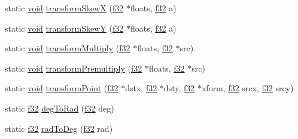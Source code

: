 \begin{DoxyCompactItemize}
\item 
static \mbox{\hyperlink{_thread_8h_af1e856da2e658414cb2456cb6f7ebc66}{void}} \mbox{\hyperlink{classnjli_1_1_world_h_u_d_ab8f44613e057b3fd9cbcdd157e1b5c8b}{transform\+SkewX}} (\mbox{\hyperlink{_util_8h_a5f6906312a689f27d70e9d086649d3fd}{f32}} $\ast$floats, \mbox{\hyperlink{_util_8h_a5f6906312a689f27d70e9d086649d3fd}{f32}} a)
\item 
static \mbox{\hyperlink{_thread_8h_af1e856da2e658414cb2456cb6f7ebc66}{void}} \mbox{\hyperlink{classnjli_1_1_world_h_u_d_a60dd37a1e941ec7fb4de80d9715454d2}{transform\+SkewY}} (\mbox{\hyperlink{_util_8h_a5f6906312a689f27d70e9d086649d3fd}{f32}} $\ast$floats, \mbox{\hyperlink{_util_8h_a5f6906312a689f27d70e9d086649d3fd}{f32}} a)
\item 
static \mbox{\hyperlink{_thread_8h_af1e856da2e658414cb2456cb6f7ebc66}{void}} \mbox{\hyperlink{classnjli_1_1_world_h_u_d_ac7d1eaae232be02562435aab386470f9}{transform\+Multiply}} (\mbox{\hyperlink{_util_8h_a5f6906312a689f27d70e9d086649d3fd}{f32}} $\ast$floats, \mbox{\hyperlink{_util_8h_a5f6906312a689f27d70e9d086649d3fd}{f32}} $\ast$src)
\item 
static \mbox{\hyperlink{_thread_8h_af1e856da2e658414cb2456cb6f7ebc66}{void}} \mbox{\hyperlink{classnjli_1_1_world_h_u_d_a8c043563ce563a2579c2bd2c8be20b70}{transform\+Premultiply}} (\mbox{\hyperlink{_util_8h_a5f6906312a689f27d70e9d086649d3fd}{f32}} $\ast$floats, \mbox{\hyperlink{_util_8h_a5f6906312a689f27d70e9d086649d3fd}{f32}} $\ast$src)
\item 
static \mbox{\hyperlink{_thread_8h_af1e856da2e658414cb2456cb6f7ebc66}{void}} \mbox{\hyperlink{classnjli_1_1_world_h_u_d_ab9769a6bdebbe227d5f81177a71d443a}{transform\+Point}} (\mbox{\hyperlink{_util_8h_a5f6906312a689f27d70e9d086649d3fd}{f32}} $\ast$dstx, \mbox{\hyperlink{_util_8h_a5f6906312a689f27d70e9d086649d3fd}{f32}} $\ast$dsty, \mbox{\hyperlink{_util_8h_a5f6906312a689f27d70e9d086649d3fd}{f32}} $\ast$xform, \mbox{\hyperlink{_util_8h_a5f6906312a689f27d70e9d086649d3fd}{f32}} srcx, \mbox{\hyperlink{_util_8h_a5f6906312a689f27d70e9d086649d3fd}{f32}} srcy)
\item 
static \mbox{\hyperlink{_util_8h_a5f6906312a689f27d70e9d086649d3fd}{f32}} \mbox{\hyperlink{classnjli_1_1_world_h_u_d_a2b5ee48baf5aabe897cfc96d39927749}{deg\+To\+Rad}} (\mbox{\hyperlink{_util_8h_a5f6906312a689f27d70e9d086649d3fd}{f32}} deg)
\item 
static \mbox{\hyperlink{_util_8h_a5f6906312a689f27d70e9d086649d3fd}{f32}} \mbox{\hyperlink{classnjli_1_1_world_h_u_d_a429103045bb7a99da0335bbf315ead7a}{rad\+To\+Deg}} (\mbox{\hyperlink{_util_8h_a5f6906312a689f27d70e9d086649d3fd}{f32}} rad)
\end{DoxyCompactItemize}
